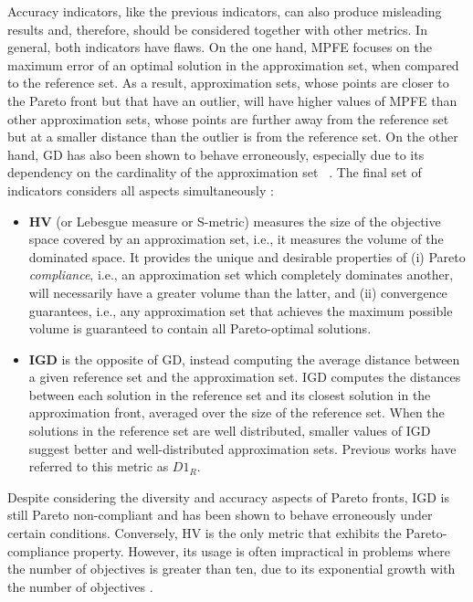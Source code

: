 	Accuracy indicators, like the previous indicators, can also produce misleading results and, therefore, should be considered together with other metrics. In general, both indicators have flaws. On the one hand, \ac{MPFE} focuses on the maximum error of an optimal solution in the approximation set, when compared to the reference set. As a result, approximation sets, whose points are closer to the Pareto front but that have an outlier, will have higher values of \ac{MPFE} than other approximation sets, whose points are further away from the reference set but at a smaller distance than the outlier is from the reference set. On the other hand, \ac{GD} has also been shown to behave erroneously, especially due to its dependency on the cardinality of the approximation set ~\cite{Ishibuchi2005GDIGD}. The final set of indicators considers all aspects simultaneously \cite{Li2017Rmetrics}:
	\begin{itemize}
		\item \textbf{\ac{HV}} (or Lebesgue measure or S-metric) measures the size of the objective space covered by an approximation set, i.e., it measures the volume of the dominated space. It provides the unique and desirable properties of (i) Pareto \textit{compliance}, i.e., an approximation set which completely dominates another, will necessarily have a greater volume than the latter, and (ii) convergence guarantees, i.e., any approximation set that achieves the maximum possible volume is guaranteed to contain all Pareto-optimal solutions.
		\item \textbf{\ac{IGD}} is the opposite of \ac{GD}, instead computing the average distance between a given reference set and the approximation set. \ac{IGD} computes the distances between each solution in the reference set and its closest solution in the approximation front, averaged over the size of the reference set. When the solutions in the reference set are well distributed, smaller values of \ac{IGD} suggest better and well-distributed approximation sets. Previous works have referred to this metric as \textbf{$D1_R$}.%
	\end{itemize}
	
	Despite considering the diversity and accuracy aspects of Pareto fronts, \ac{IGD} is still Pareto non-compliant and has been shown to behave erroneously under certain conditions. Conversely, \ac{HV} is the only metric that exhibits the Pareto-compliance property. However, its usage is often impractical in problems where the number of objectives is greater than ten, due to its exponential growth with the number of objectives \cite{Ishibuchi2005GDIGD}.
	
